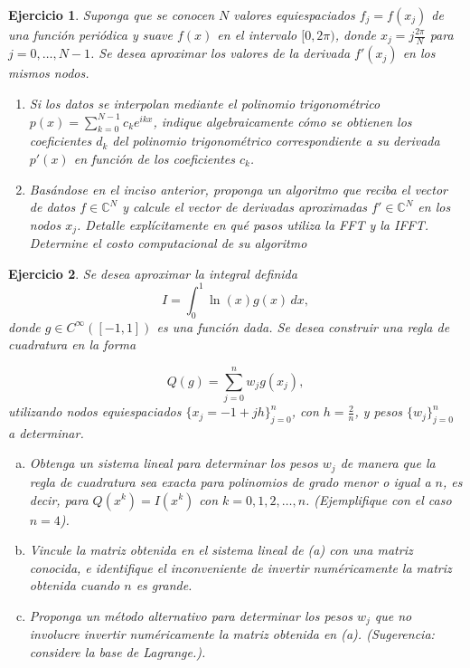 \documentclass[12pt]{article}%
\newtheorem{exercise}{Ejercicio}
\begin{document}
\vskip 0.5cm

\begin{exercise}
Suponga que se conocen $N$ valores equiespaciados $f_j = f(x_j)$ de una función periódica y suave $f(x)$ en el intervalo $[0, 2\pi)$, donde $x_j = j \frac{2\pi}{N}$ para $j=0, \dots, N-1$. Se desea aproximar los valores de la derivada $f'(x_j)$ en los mismos nodos.

\begin{enumerate}

    \item[a)] Si los datos se interpolan mediante el polinomio trigonométrico $p(x) = \sum_{k=0}^{N-1} c_k e^{ikx}$, indique algebraicamente cómo se obtienen los coeficientes $d_k$ del polinomio trigonométrico correspondiente a su derivada $p'(x)$ en función de los coeficientes $c_k$.

    \item[b)] Basándose en el inciso anterior, proponga un algoritmo que reciba el vector de datos $f \in \mathbb{C}^N$ y calcule el vector de derivadas aproximadas $f' \in \mathbb{C}^N$ en los nodos $x_j$. Detalle explícitamente en qué pasos utiliza la FFT y la IFFT. Determine el costo computacional de su algoritmo

\end{enumerate}
\end{exercise}



\begin{exercise}
Se desea aproximar la integral definida $$I = \int_{0}^1 \ln(x) g(x) \, dx,$$ donde $g \in C^\infty([-1, 1])$ es una función dada. Se desea construir una regla de cuadratura en la forma

$$ Q(g) = \sum_{j=0}^{n} w_j g(x_j),$$
utilizando nodos equiespaciados $\{ x_j = -1 + jh \}_{j=0}^{n}$, con $h = \frac{2}{n}$, y pesos $\{ w_j \}_{j=0}^{n}$ a determinar.

\begin{enumerate}[(a)]
    \item Obtenga un sistema lineal para determinar los pesos $w_j$ de manera que la regla de cuadratura sea exacta para polinomios de grado menor o igual a $n$, es decir, para $Q(x^k)=I(x^k)$ con $k=0,1,2, \dots, n$. (Ejemplifique con el caso $n=4$).
    \item Vincule la matriz obtenida en el sistema lineal de (a) con una matriz conocida, e identifique el inconveniente de invertir \textit{numéricamente} la matriz obtenida cuando $n$ es grande. 
    \item Proponga un método alternativo para determinar los pesos $w_j$ que no involucre invertir \textit{numéricamente} la matriz obtenida en (a). (Sugerencia: considere la base de Lagrange.).
\end{enumerate}

\end{exercise}
\end{document}
